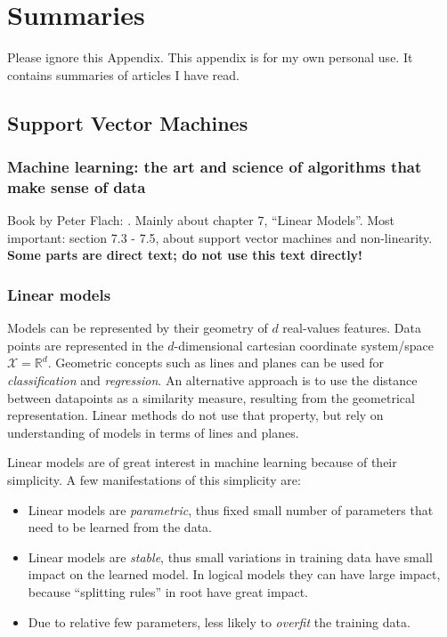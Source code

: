 
\chapter{Summaries} %

\label{AppendixA} %


Please ignore this Appendix.
This appendix is for my own personal use.
It contains summaries of articles I have read.

\section{Support Vector Machines}

\subsection{Machine learning: the art and science of algorithms that make sense of data}
Book by Peter Flach: \cite{flach2012machine}.
Mainly about chapter 7, ``Linear Models''.
Most important: section 7.3 - 7.5, about support vector machines and non-linearity.
\textbf{Some parts are direct text; do not use this text directly!}


\subsection{Linear models}
Models can be represented by their geometry of $d$ real-values features.
Data points are represented in the $d$-dimensional cartesian coordinate system/space $\mathcal{X} = \mathbb{R}^d$.
Geometric concepts such as lines and planes can be used for \emph{classification} and \emph{regression}.
An alternative approach is to use the distance between datapoints as a similarity measure, resulting from the geometrical representation.
Linear methods do not use that property, but rely on understanding of models in terms of lines and planes.

Linear models are of great interest in machine learning because of their simplicity.
A few manifestations of this simplicity are:
\begin{itemize}
  \item Linear models are \emph{parametric}, thus fixed small number of parameters that need to be learned from the data.
  \item Linear models are \emph{stable}, thus small variations in training data have small impact on the learned model. In logical models they can have large impact, because ``splitting rules'' in root have great impact.
  \item Due to relative few parameters, less likely to \emph{overfit} the training data.
\end{itemize}

